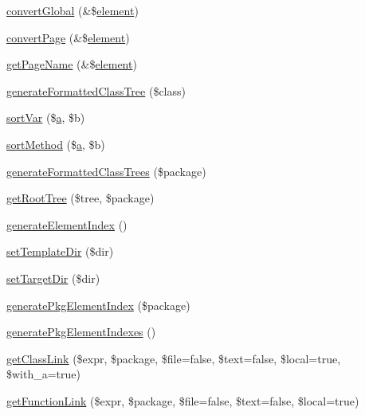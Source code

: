 \begin{DoxyCompactItemize}
\item 
\hyperlink{class_x_m_l_doc_book_converter_a1d1bb2b092be87ba7a40b0064ac43b6c}{convert\-Global} (\&\$\hyperlink{bug-904820_8php_aa94081298ab2dfd0f261cce6c203d9aa}{element})
\item 
\hyperlink{class_x_m_l_doc_book_converter_a48d30cbead70c887449fda723aa0bb6e}{convert\-Page} (\&\$\hyperlink{bug-904820_8php_aa94081298ab2dfd0f261cce6c203d9aa}{element})
\item 
\hyperlink{class_x_m_l_doc_book_converter_ad39e717881e42150610bbed94471f8bf}{get\-Page\-Name} (\&\$\hyperlink{bug-904820_8php_aa94081298ab2dfd0f261cce6c203d9aa}{element})
\item 
\hyperlink{class_x_m_l_doc_book_converter_a694db0f7353906320d85ee37bd7e2fc5}{generate\-Formatted\-Class\-Tree} (\$class)
\item 
\hyperlink{class_x_m_l_doc_book_converter_a289e8b5fc5ba77255d344e7d24ac64a5}{sort\-Var} (\$\hyperlink{classa}{a}, \$b)
\item 
\hyperlink{class_x_m_l_doc_book_converter_ac169dd8b41da10e16c21f4e6685ee3af}{sort\-Method} (\$\hyperlink{classa}{a}, \$b)
\item 
\hyperlink{class_x_m_l_doc_book_converter_ac4ce6d55dd5c5683966b882dcc6809e0}{generate\-Formatted\-Class\-Trees} (\$package)
\item 
\hyperlink{class_x_m_l_doc_book_converter_afbb2d3f59f731227c79f10ca318c2e88}{get\-Root\-Tree} (\$tree, \$package)
\item 
\hyperlink{class_x_m_l_doc_book_converter_a2b514cc775614890edad823f189b2655}{generate\-Element\-Index} ()
\item 
\hyperlink{class_x_m_l_doc_book_converter_a3b18827bcab9cfc5d259cba6fa5ec535}{set\-Template\-Dir} (\$dir)
\item 
\hyperlink{class_x_m_l_doc_book_converter_a07611111094b2954729773f6436a0fe1}{set\-Target\-Dir} (\$dir)
\item 
\hyperlink{class_x_m_l_doc_book_converter_ad067ad187db8d433a5de042050c63ada}{generate\-Pkg\-Element\-Index} (\$package)
\item 
\hyperlink{class_x_m_l_doc_book_converter_a147e3da92be9273af6ea18e5a20beeaa}{generate\-Pkg\-Element\-Indexes} ()
\item 
\hyperlink{class_x_m_l_doc_book_converter_aa0f8f1921df0988e161dff6f4f3e8abf}{get\-Class\-Link} (\$expr, \$package, \$file=false, \$text=false, \$local=true, \$with\-\_\-a=true)
\item 
\hyperlink{class_x_m_l_doc_book_converter_af86fc0c291312dfb7535ecc91f4e84b2}{get\-Function\-Link} (\$expr, \$package, \$file=false, \$text=false, \$local=true)

\end{DoxyCompactItemize}
